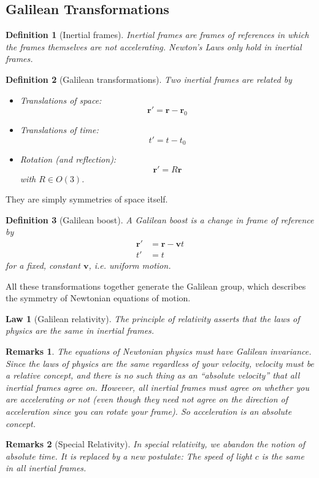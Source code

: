 \documentclass[a4paper]{article}
\newtheorem{defi}{Definition}[section]
\newtheorem{remarks}{Remarks}[section]
\newtheorem{law}{Law}[section]
\theoremstyle{new}
\begin{document}
\subsection{Galilean Transformations}
\begin{defi}[Inertial frames]
  Inertial frames are frames of references in which the frames themselves are not accelerating. Newton's Laws only hold in inertial frames.
\end{defi}
\begin{defi}[Galilean transformations]
  Two inertial frames are related by
  \begin{itemize}
  \item Translations of space:
    \[
      \mathbf{r}' = \mathbf{r} - \mathbf{r}_0
    \]
  \item Translations of time:
    \[
      t' = t - t_0
    \]
  \item Rotation (and reflection):
    \[
      \mathbf{r}' = R\mathbf{r}
    \]
    with $R\in O(3)$.
\end{itemize}
\end{defi}
They are simply symmetries of space itself.
\begin{defi}[Galilean boost]
  A Galilean boost is a change in frame of reference by
  \begin{align*}
    \mathbf{r}' &= \mathbf{r} - \mathbf{v}t\\
    t' &= t
  \end{align*}
  for a fixed, constant $\mathbf{v}$, i.e. uniform motion.
\end{defi}
All these transformations together generate the Galilean group, which describes the symmetry of Newtonian equations of motion.
\begin{law}[Galilean relativity]
  The principle of relativity asserts that the laws of physics are the same in inertial frames.
\end{law}
\begin{remarks}
The equations of Newtonian physics must have Galilean invariance. Since the laws of physics are the same regardless of your velocity, velocity must be a relative concept, and there is no such thing as an ``absolute velocity'' that all inertial frames agree on. However, all inertial frames must agree on whether you are accelerating or not (even though they need not agree on the direction of acceleration since you can rotate your frame). So acceleration is an absolute concept.
\end{remarks}
\begin{remarks}[Special Relativity]
In special relativity, we abandon the notion of absolute time. It is replaced by a new postulate: The speed of light $c$ is the same in all inertial frames.
\end{remarks}
\end{document}
